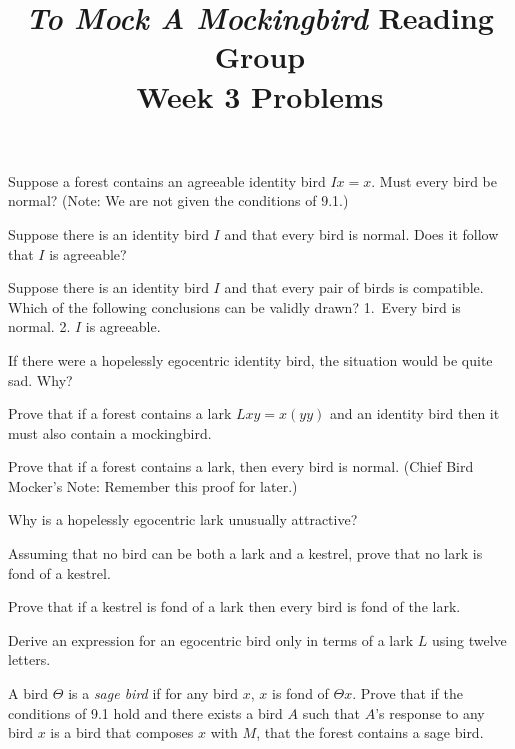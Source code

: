 \documentclass[12pt, letterpaper]{article}
\title{\emph{To Mock A Mockingbird} Reading Group\\Week 3 Problems}
\begin{document}
\maketitle

\disclaimer

\begin{prob}{9.20}
Suppose a forest contains an agreeable identity bird $Ix = x$. Must every bird be normal? (Note: We are not given the conditions of 9.1.)
\end{prob}

\begin{prob}{9.21}
Suppose there is an identity bird $I$ and that every bird is normal. Does it follow that $I$ is agreeable?
\end{prob}

\begin{prob}{9.22}
Suppose there is an identity bird $I$ and that every pair of birds is compatible. Which of the following conclusions can be validly drawn? 1.~Every bird is normal. 2. $I$ is agreeable.
\end{prob}

\begin{prob}{9.23}
If there were a hopelessly egocentric identity bird, the situation would be quite sad. Why?
\end{prob}

\begin{prob}{9.24}
Prove that if a forest contains a lark $Lxy = x(yy)$ and an identity bird then it must also contain a mockingbird.
\end{prob}

\begin{prob}{9.25}
Prove that if a forest contains a lark, then every bird is normal. (Chief Bird Mocker's Note: Remember this proof for later.)
\end{prob}

\begin{prob}{9.26}
Why is a hopelessly egocentric lark unusually attractive?
\end{prob}

\begin{prob}{9.27}
Assuming that no bird can be both a lark and a kestrel, prove that no lark is fond of a kestrel.
\end{prob}

\begin{prob}{9.28}
Prove that if a kestrel is fond of a lark then every bird is fond of the lark.
\end{prob}

\begin{prob}{9.29}
Derive an expression for an egocentric bird only in terms of a lark $L$ using twelve letters.
\end{prob}

\begin{prob}{10.1}
A bird $\Theta$ is a \emph{sage bird} if for any bird $x$, $x$ is fond of $\Theta x$. Prove that if the conditions of 9.1 hold and there exists a bird $A$ such that $A$'s response to any bird $x$ is a bird that composes $x$ with $M$, that the forest contains a sage bird.
\end{prob}
\end{document}
